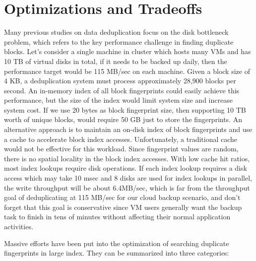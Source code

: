 \section{Optimizations and Tradeoffs}
\label{back:optm}
Many previous studies on data deduplication focus on the disk bottleneck problem,
which refers to the key performance challenge in finding duplicate blocks. 
Let's consider a single machine in cluster which hosts many VMs and has 10 TB of virtual disks in total,
if it needs to be backed up daily, then the performance target would be 115 MB/sec on each machine.
Given a block size of 4 KB, a deduplication system must process approximately 28,900 blocks per second.
An in-memory index of all block fingerprints could easily achieve this performance, but the size of the index would limit system size and increase system cost. 
If we use 20 bytes as block fingerprint size, then supporting 10 TB worth of unique blocks, would require 50 GB just to store the fingerprints.
An alternative approach is to maintain an on-disk index of block fingerprints and use a cache to accelerate block index accesses. Unfortunately, a traditional cache would not be effective for this workload. Since fingerprint values are random, there is no spatial locality in the block index accesses. 
With low cache hit ratios, most index lookups require disk operations. If each index lookup requires a disk access which may take 10 msec and 8 disks are used for index lookups in parallel, the write throughput will be about 6.4MB/sec, which is far from the throughput goal of deduplicating at 115 MB/sec for our cloud backup scenario, and don't forget that this goal
is conservative since VM users generally want the backup task to finish in tens of minutes without affecting their normal
application activities.

Massive efforts have been put into the optimization of searching duplicate
fingerprints in large index. They can be summarized into three categories:


